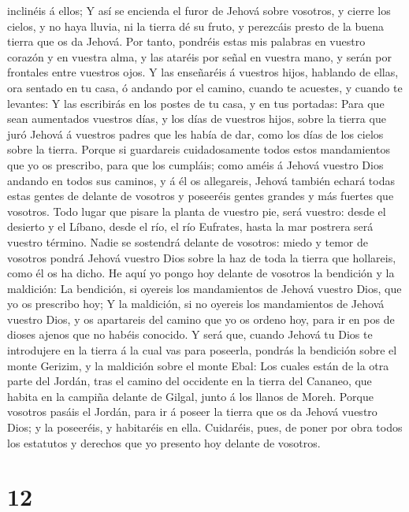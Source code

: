 inclinéis á ellos;  Y así se encienda el furor de Jehová
sobre vosotros, y cierre los cielos, y no haya lluvia, ni la tierra dé
su fruto, y perezcáis presto de la buena tierra que os da Jehová.
 Por tanto, pondréis estas mis palabras en vuestro corazón
y en vuestra alma, y las ataréis por señal en vuestra mano, y serán por
frontales entre vuestros ojos.  Y las enseñaréis á vuestros
hijos, hablando de ellas, ora sentado en tu casa, ó andando por el
camino, cuando te acuestes, y cuando te levantes:  Y las
escribirás en los postes de tu casa, y en tus portadas: 
Para que sean aumentados vuestros días, y los días de vuestros hijos,
sobre la tierra que juró Jehová á vuestros padres que les había de dar,
como los días de los cielos sobre la tierra.  Porque si
guardareis cuidadosamente todos estos mandamientos que yo os prescribo,
para que los cumpláis; como améis á Jehová vuestro Dios andando en todos
sus caminos, y á él os allegareis,  Jehová también echará
todas estas gentes de delante de vosotros y poseeréis gentes grandes y
más fuertes que vosotros.  Todo lugar que pisare la planta
de vuestro pie, será vuestro: desde el desierto y el Líbano, desde el
río, el río Eufrates, hasta la mar postrera será vuestro término.
 Nadie se sostendrá delante de vosotros: miedo y temor de
vosotros pondrá Jehová vuestro Dios sobre la haz de toda la tierra que
hollareis, como él os ha dicho.  He aquí yo pongo hoy
delante de vosotros la bendición y la maldición:  La
bendición, si oyereis los mandamientos de Jehová vuestro Dios, que yo os
prescribo hoy;  Y la maldición, si no oyereis los
mandamientos de Jehová vuestro Dios, y os apartareis del camino que yo
os ordeno hoy, para ir en pos de dioses ajenos que no habéis conocido.
 Y será que, cuando Jehová tu Dios te introdujere en la
tierra á la cual vas para poseerla, pondrás la bendición sobre el monte
Gerizim, y la maldición sobre el monte Ebal:  Los cuales
están de la otra parte del Jordán, tras el camino del occidente en la
tierra del Cananeo, que habita en la campiña delante de Gilgal, junto á
los llanos de Moreh.  Porque vosotros pasáis el Jordán,
para ir á poseer la tierra que os da Jehová vuestro Dios; y la
poseeréis, y habitaréis en ella.  Cuidaréis, pues, de poner
por obra todos los estatutos y derechos que yo presento hoy delante de
vosotros.

\hypertarget{section-11}{%
\section{12}\label{section-11}}

